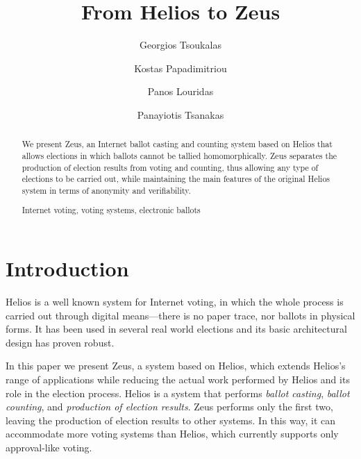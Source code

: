 \documentclass[runningheads,a4paper]{llncs}
\newcommand{\keywords}[1]{\par\addvspace\baselineskip
\noindent\keywordname\enspace\ignorespaces#1}
\begin{document}
\mainmatter  %

\title{From Helios to Zeus}


\author{Georgios Tsoukalas%
\and Kostas Papadimitriou%
\and Panos Louridas%
\and Panayiotis Tsanakas}



\maketitle

\begin{abstract}
  We present Zeus, an Internet ballot casting and counting system
  based on Helios that allows elections in which ballots cannot be
  tallied homomorphically. Zeus separates the production of election
  results from voting and counting, thus allowing any type of
  elections to be carried out, while maintaining the main features of
  the original Helios system in terms of anonymity and verifiability.
  \keywords{Internet voting, voting systems, electronic ballots}
\end{abstract}


\section{Introduction}

Helios is a well known system for Internet voting, in which the whole
process is carried out through digital means---there is no paper
trace, nor ballots in physical forms. It has been used in several real
world elections and its basic architectural design has proven robust.

In this paper we present Zeus, a system based on Helios, which extends
Helios's range of applications while reducing the actual work
performed by Helios and its role in the election process. Helios is a
system that performs \emph{ballot casting}, \emph{ballot counting},
and \emph{production of election results}. Zeus performs only the
first two, leaving the production of election results to other
systems. In this way, it can accommodate more voting systems than
Helios, which currently supports only approval-like voting.
\end{document}
